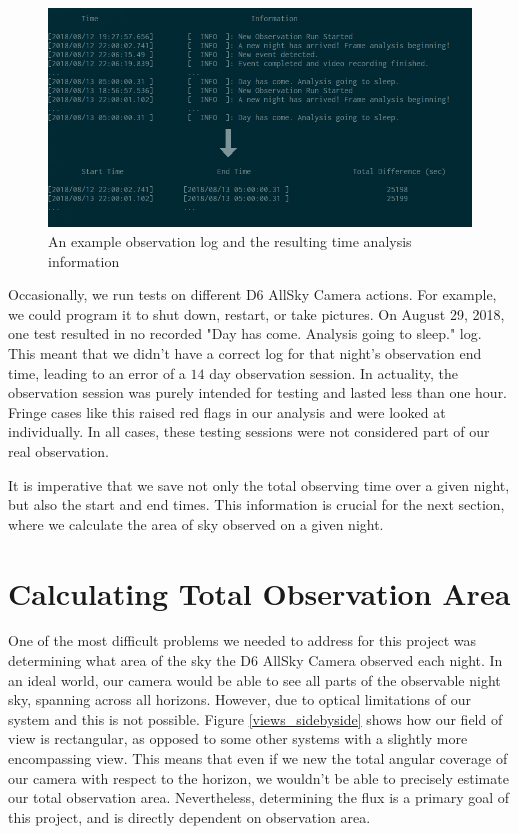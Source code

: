 \begin{figure}[ht!]
  \centering
  \includegraphics[scale=0.51]{images/obslog_time.png}
  \caption{An example observation log and the resulting time analysis information}
  \label{obslog_time}
\end{figure}

Occasionally, we run tests on different D6 AllSky Camera actions. 
For example, we could program it to shut down, restart, or take pictures.
On August 29, 2018, one test resulted in no recorded "Day has come.  Analysis going to sleep." log.
This meant that we didn't have a correct log for that night's observation end time, leading to an error of a $14$ day observation session.
In actuality, the observation session was purely intended for testing and lasted less than one hour.  
Fringe cases like this raised red flags in our analysis and were looked at individually.
In all cases, these testing sessions were not considered part of our real observation.


It is imperative that we save not only the total observing time over a given night, but also the start and end times. 
This information is crucial for the next section, where we calculate the area of sky observed on a given night.

\section{Calculating Total Observation Area}

One of the most difficult problems we needed to address for this project was determining what area of the sky the D6 AllSky Camera observed each night.  
In an ideal world, our camera would be able to see all parts of the observable night sky, spanning across all horizons.  
However, due to optical limitations of our system and this is not possible.
Figure \ref{views_sidebyside} shows how our field of view is rectangular, as opposed to some other systems with a slightly more encompassing view.
This means that even if we new the total angular coverage of our camera with respect to the horizon, we wouldn't be able to precisely estimate our total observation area.
Nevertheless, determining the flux is a primary goal of this project, and is directly dependent on observation area. 

